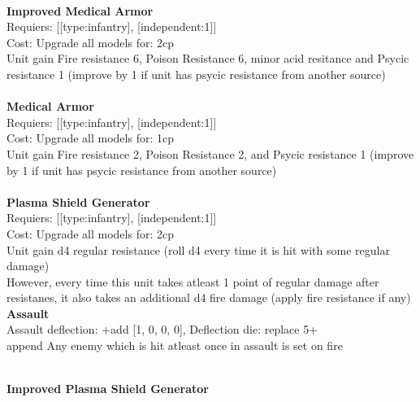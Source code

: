 \ \\
{\bf Improved Medical Armor } \\

Requiers: [[type:infantry], [independent:1]] \\
Cost: Upgrade all models for: 2cp \\
Unit gain Fire resistance 6, Poison Resistance 6, minor acid resitance and Psycic resistance 1 (improve by 1 if unit has psycic resistance from another source)\\ 









\ \\
{\bf Medical Armor } \\

Requiers: [[type:infantry], [independent:1]] \\
Cost: Upgrade all models for: 1cp \\
Unit gain Fire resistance 2, Poison Resistance 2, and Psycic resistance 1 (improve by 1 if unit has psycic resistance from another source)\\ 









\ \\
{\bf Plasma Shield Generator } \\

Requiers: [[type:infantry], [independent:1]] \\
Cost: Upgrade all models for: 2cp \\
Unit gain d4 regular resistance (roll d4 every time it is hit with some regular damage)\\ 
However, every time this unit takes atleast 1 point of regular damage after resistanes, it also takes an additional d4 fire damage (apply fire resistance if any)\\ 




{\bf Assault} \ \\
Assault deflection: +add [1, 0, 0, 0], Deflection die: replace 5+
\\ 

append Any enemy which is hit atleast once in assault is set on fire


\ \\
{\bf Improved Plasma Shield Generator } \\

